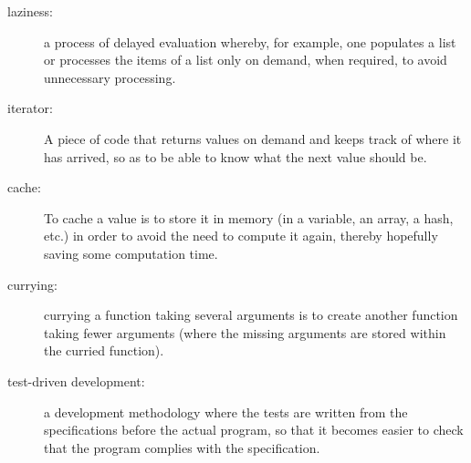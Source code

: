 \begin{description}
\item[laziness:] a process of delayed evaluation whereby, for 
example, one populates a list or processes the items of a list only 
on demand, when required, to avoid unnecessary processing.

\item[iterator:] A piece of code that returns values on demand 
and keeps track of where it has arrived, so as to be able 
to know what the next value should be.

\item[cache:] To cache a value is to store it in memory (in a 
variable, an array, a hash, etc.) in order to avoid the need to 
compute it again, thereby hopefully saving some computation time.

\item[currying:] currying a function taking several arguments is 
to create another function taking fewer arguments (where the missing 
arguments are stored within the curried function).

\item[test-driven development:] a development methodology 
where the tests are written from the specifications before 
the actual program, so that it becomes easier to check that 
the program complies with the specification.

\end{description}
